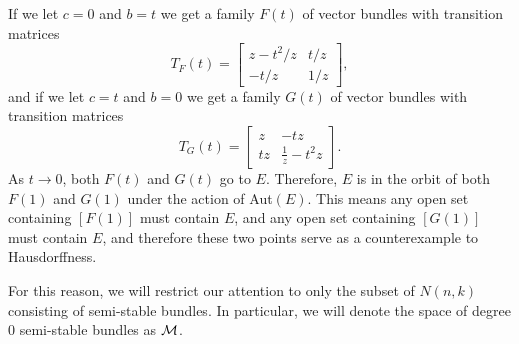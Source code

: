 	If we let $c=0$ and $b=t$ we get a family $F(t)$ of vector bundles with transition matrices
	\begin{equation*}
		T_{F}(t) = \begin{bmatrix}
		z-t^2/z & t/z\\
		-t/z & 1/z
		\end{bmatrix},
	\end{equation*}
	and if we let $c=t$ and $b=0$ we get a family $G(t)$ of vector bundles with transition matrices
	\begin{equation*}
		T_{G}(t) = \begin{bmatrix}
		z & -tz\\
		tz & \frac{1}{z}-t^2 z
		\end{bmatrix}.
	\end{equation*}
	As $t\to 0$, both $F(t)$ and $G(t)$ go to $E$. Therefore, $E$ is in the orbit of both $F(1)$ and $G(1)$ under the action of Aut$(E)$. This means any open set containing $[F(1)]$ must contain $E$, and any open set containing $[G(1)]$ must contain $E$, and therefore these two points serve as a counterexample to Hausdorffness.
	
	For this reason, we will restrict our attention to only the subset of $N(n,k)$ consisting of semi-stable bundles. In particular, we will denote the space of degree $0$ semi-stable bundles as $\mathcal{M}$. 
	
	
	
